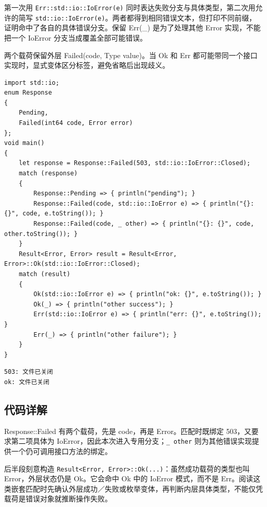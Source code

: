 第一次用 \texttt{Err:\allowbreak{}:\allowbreak{}std:\allowbreak{}:\allowbreak{}io:\allowbreak{}:\allowbreak{}Io\allowbreak{}Error(\allowbreak{}e)\allowbreak{}} 同时表达失败分支与具体类型，第二次用允许的简写 \texttt{std:\allowbreak{}:\allowbreak{}io:\allowbreak{}:\allowbreak{}Io\allowbreak{}Error(\allowbreak{}e)\allowbreak{}}。两者都得到相同错误文本，但打印不同前缀，证明命中了各自的具体错误分支。保留 Err(\_) 是为了处理其他 Error 实现，不能把一个 IoError 分支当成覆盖全部可能错误。

两个载荷保留外层 Failed(code, Type value)。当 Ok 和 Err 都可能带同一个接口实现时，显式变体区分标签，避免省略后出现歧义。

\par
\medskip
\begin{lstlisting}[style=chali]
import std::io;
enum Response
{
    Pending,
    Failed(int64 code, Error error)
};
void main()
{
    let response = Response::Failed(503, std::io::IoError::Closed);
    match (response)
    {
        Response::Pending => { println("pending"); }
        Response::Failed(code, std::io::IoError e) => { println("{}: {}", code, e.toString()); }
        Response::Failed(code, _ other) => { println("{}: {}", code, other.toString()); }
    }
    Result<Error, Error> result = Result<Error, Error>::Ok(std::io::IoError::Closed);
    match (result)
    {
        Ok(std::io::IoError e) => { println("ok: {}", e.toString()); }
        Ok(_) => { println("other success"); }
        Err(std::io::IoError e) => { println("err: {}", e.toString()); }
        Err(_) => { println("other failure"); }
    }
}
\end{lstlisting}
\par
\medskip

\par
\medskip
\begin{lstlisting}[style=out]
503: 文件已关闭
ok: 文件已关闭
\end{lstlisting}
\par
\medskip

\subsection*{代码详解}

Response::Failed 有两个载荷，先是 code，再是 Error。匹配时既绑定 503，又要求第二项具体为 IoError，因此本次进入专用分支；\texttt{\_\allowbreak{} other} 则为其他错误实现提供一个仍可调用接口方法的绑定。

后半段刻意构造 \texttt{Result<\allowbreak{}Error,\allowbreak{} Error>\allowbreak{}:\allowbreak{}:\allowbreak{}Ok(\allowbreak{}.\allowbreak{}.\allowbreak{}.\allowbreak{})\allowbreak{}}：虽然成功载荷的类型也叫 Error，外层状态仍是 Ok。它会命中 Ok 中的 IoError 模式，而不是 Err。阅读这类嵌套匹配时先确认外层成功／失败或枚举变体，再判断内层具体类型，不能仅凭载荷是错误对象就推断操作失败。

